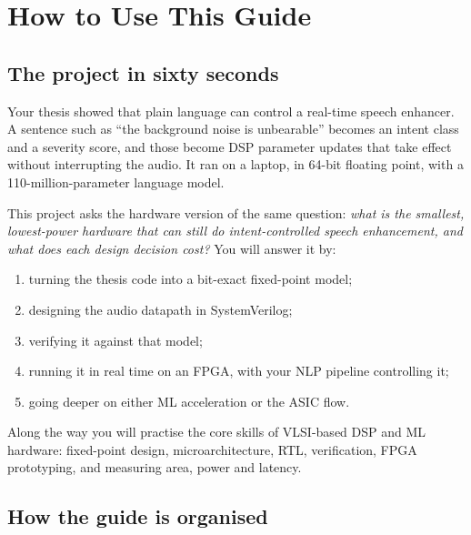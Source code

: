 \chapter*{How to Use This Guide}\label{ch:howto}

\section*{The project in sixty seconds}

Your thesis showed that plain language can control a real-time speech enhancer.
A sentence such as \enquote{the background noise is unbearable} becomes an
intent class and a severity score, and those become DSP parameter updates that
take effect without interrupting the audio. It ran on a laptop, in 64-bit
floating point, with a 110-million-parameter language model.

This project asks the hardware version of the same question: \emph{what is the
smallest, lowest-power hardware that can still do intent-controlled speech
enhancement, and what does each design decision cost?} You will answer it by:
\begin{enumerate}
  \item turning the thesis code into a bit-exact fixed-point model;
  \item designing the audio datapath in SystemVerilog;
  \item verifying it against that model;
  \item running it in real time on an FPGA, with your NLP pipeline controlling it;
  \item going deeper on either ML acceleration or the ASIC flow.
\end{enumerate}
Along the way you will practise the core skills of VLSI-based DSP and ML
hardware: fixed-point design, microarchitecture, RTL, verification, FPGA
prototyping, and measuring area, power and latency.

\section*{How the guide is organised}

